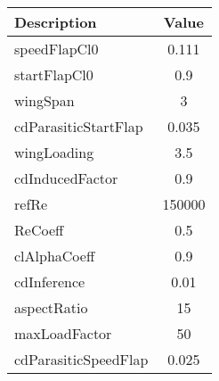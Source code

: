        \begin{center}

            \begin{tabular}{|l|c|}

               \hline

Description & Value  \\ \hline \hline 

speedFlapCl0 & 0.111 \\ \hline 

startFlapCl0 & 0.9 \\ \hline 

wingSpan & 3 \\ \hline 

cdParasiticStartFlap & 0.035 \\ \hline 

wingLoading & 3.5 \\ \hline 

cdInducedFactor & 0.9 \\ \hline 

refRe & 150000 \\ \hline 

ReCoeff & 0.5 \\ \hline 

clAlphaCoeff & 0.9 \\ \hline 

cdInference & 0.01 \\ \hline 

aspectRatio & 15 \\ \hline 

maxLoadFactor & 50 \\ \hline 

cdParasiticSpeedFlap & 0.025 \\ \hline 

            \end{tabular}

        \end{center}

